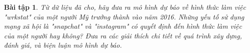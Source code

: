 \documentclass[14pt, a4paper]{article}
\theoremstyle{sltheorem}
\newtheorem{baitap}{Bài tập}
\theoremstyle{soltheorem}
\begin{document}
\begin{titlepage}






    \vfill %

\end{titlepage}

\nocite{*}


\begin{baitap}
    Từ dữ liệu đã cho, hãy đưa ra mô hình dự báo về hình thức làm việc "wrkstat" của một người Mỹ trưởng thành vào năm 2016. 
    Những yếu tố sử dụng mạng xã hội là "snapchat" và "instagram" có quyết định đến hình thức làm việc của một người hay không? 
    Đưa ra các giải thích chi tiết về quá trình xây dựng, đánh giá, và biện luận mô hình dự báo.
\end{baitap}


        
            
\end{document}
